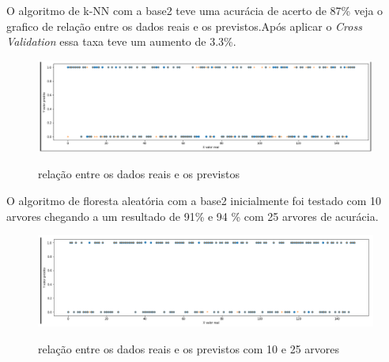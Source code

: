 O algoritmo de k-NN com a base2 teve uma acurácia de acerto de 87\% veja o grafico de relação entre os dados reais e os previstos.Após aplicar o \textit{Cross Validation} essa taxa teve um aumento de 3.3\%.
\begin{figure}[htbp]
	\begin{center}
		\includegraphics[width=1.2\linewidth]{imagens/knnAPI.png}\\
	\end{center}
	\caption[relação entre os dados reais e os previstos]{relação entre os dados reais e os previstos}
	\label{fig:logo}
\end{figure}

\newpage
O algoritmo de floresta aleatória com a base2 inicialmente foi testado com 10 arvores chegando a um resultado de 91\%  e 94 \% com 25 arvores de acurácia.
\begin{figure}[htbp]
	\begin{center}
		\includegraphics[width=1.2\linewidth]{imagens/florestaaleatoria.png}\\
	\end{center}
	\caption[relação entre os dados reais e os previstos com 10 e 25 arvores]{relação entre os dados reais e os previstos com 10 e 25 arvores}
	\label{fig:logo}
\end{figure}

